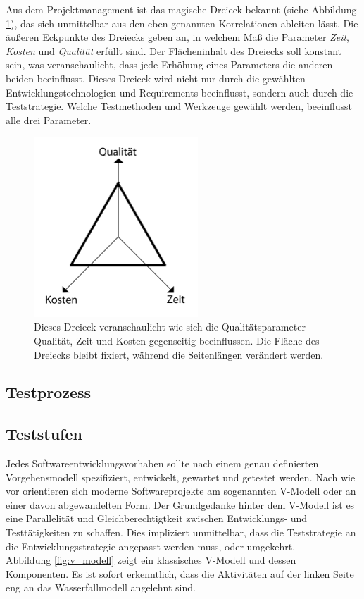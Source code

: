 Aus dem Projektmanagement ist das magische Dreieck bekannt (siehe Abbildung \ref{fig:magic_triangle}), das sich unmittelbar aus den eben genannten Korrelationen ableiten lässt. Die äußeren Eckpunkte des Dreiecks geben an, in welchem Maß die Parameter \textit{Zeit}, \textit{Kosten} und \textit{Qualität} erfüllt sind. Der Flächeninhalt des Dreiecks soll konstant sein, was veranschaulicht, dass jede Erhöhung eines Parameters die anderen beiden beeinflusst. Dieses Dreieck wird nicht nur durch die gewählten Entwicklungstechnologien und Requirements beeinflusst, sondern auch durch die Teststrategie. Welche Testmethoden und Werkzeuge gewählt werden, beeinflusst alle drei Parameter.

\begin{figure}[h] 
  \centering
     \includegraphics[width=0.55\textwidth]{figures/magic_triangle.png}
  \caption{Dieses Dreieck veranschaulicht wie sich die Qualitätsparameter Qualität, Zeit und Kosten gegenseitig beeinflussen. Die Fläche des Dreiecks bleibt fixiert, während die Seitenlängen verändert werden.}
  \label{fig:magic_triangle}
\end{figure}


\subsection{Testprozess}

\subsection{Teststufen}
\label{sec:teststufen}
Jedes Softwareentwicklungsvorhaben sollte nach einem genau definierten Vorgehensmodell spezifiziert, entwickelt, gewartet und getestet werden\cite{spillner_basiswissen_2012}. Nach wie vor orientieren sich moderne Softwareprojekte am sogenannten V-Modell\cite{boehm_verifying_1984} oder an einer davon abgewandelten Form. Der Grundgedanke hinter dem V-Modell ist es eine Parallelität und Gleichberechtigtkeit zwischen Entwicklungs- und Testtätigkeiten zu schaffen. Dies impliziert unmittelbar, dass die Teststrategie an die Entwicklungsstrategie angepasst werden muss, oder umgekehrt.\\
Abbildung \ref{fig:v_modell} zeigt ein klassisches V-Modell und dessen Komponenten. Es ist sofort erkenntlich, dass die Aktivitäten auf der linken Seite eng an das Wasserfallmodell angelehnt sind.

